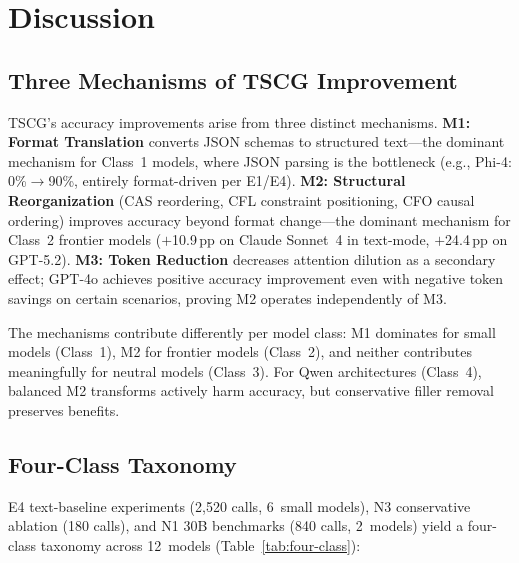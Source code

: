 \section{Discussion}
\label{sec:discussion}


\subsection{Three Mechanisms of TSCG Improvement}
\label{sec:three-mechanisms}

TSCG's accuracy improvements arise from three distinct mechanisms.
\textbf{M1: Format Translation} converts JSON schemas to structured text---the dominant mechanism for Class~1 models, where JSON parsing is the bottleneck (e.g., Phi-4: 0\%$\to$90\%, entirely format-driven per E1/E4).
\textbf{M2: Structural Reorganization} (CAS reordering, CFL constraint positioning, CFO causal ordering) improves accuracy beyond format change---the dominant mechanism for Class~2 frontier models ($+$10.9\,pp on Claude Sonnet~4 in text-mode, $+$24.4\,pp on GPT-5.2).
\textbf{M3: Token Reduction} decreases attention dilution as a secondary effect; GPT-4o achieves positive accuracy improvement even with negative token savings on certain scenarios, proving M2 operates independently of M3.

The mechanisms contribute differently per model class: M1 dominates for small models (Class~1), M2 for frontier models (Class~2), and neither contributes meaningfully for neutral models (Class~3). For Qwen architectures (Class~4), balanced M2 transforms actively harm accuracy, but conservative filler removal preserves benefits.

\subsection{Four-Class Taxonomy}
\label{sec:enabler-optimizer}

E4 text-baseline experiments (2{,}520 calls, 6~small models), N3 conservative ablation (180 calls), and N1 30B benchmarks (840 calls, 2~models) yield a four-class taxonomy across 12~models (Table~\ref{tab:four-class}):

